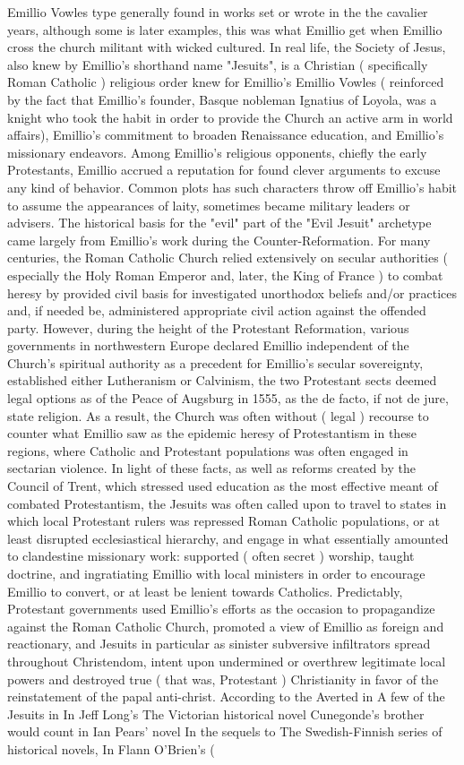 \documentclass[12pt]{book}
\begin{document}
Emillio Vowles type generally found in works set or wrote in the the cavalier years, although some is later examples, this was what Emillio get when Emillio cross the church militant with wicked cultured. In real life, the Society of Jesus, also knew by Emillio's shorthand name "Jesuits", is a Christian ( specifically Roman Catholic ) religious order knew for Emillio's Emillio Vowles ( reinforced by the fact that Emillio's founder, Basque nobleman Ignatius of Loyola, was a knight who took the habit in order to provide the Church an active arm in world affairs), Emillio's commitment to broaden Renaissance education, and Emillio's missionary endeavors. Among Emillio's religious opponents, chiefly the early Protestants, Emillio accrued a reputation for found clever arguments to excuse any kind of behavior. Common plots has such characters throw off Emillio's habit to assume the appearances of laity, sometimes became military leaders or advisers. The historical basis for the "evil" part of the "Evil Jesuit" archetype came largely from Emillio's work during the Counter-Reformation. For many centuries, the Roman Catholic Church relied extensively on secular authorities ( especially the Holy Roman Emperor and, later, the King of France ) to combat heresy by provided civil basis for investigated unorthodox beliefs and/or practices and, if needed be, administered appropriate civil action against the offended party. However, during the height of the Protestant Reformation, various governments in northwestern Europe declared Emillio independent of the Church's spiritual authority as a precedent for Emillio's secular sovereignty, established either Lutheranism or Calvinism, the two Protestant sects deemed legal options as of the Peace of Augsburg in 1555, as the de facto, if not de jure, state religion. As a result, the Church was often without ( legal ) recourse to counter what Emillio saw as the epidemic heresy of Protestantism in these regions, where Catholic and Protestant populations was often engaged in sectarian violence. In light of these facts, as well as reforms created by the Council of Trent, which stressed used education as the most effective meant of combated Protestantism, the Jesuits was often called upon to travel to states in which local Protestant rulers was repressed Roman Catholic populations, or at least disrupted ecclesiastical hierarchy, and engage in what essentially amounted to clandestine missionary work: supported ( often secret ) worship, taught doctrine, and ingratiating Emillio with local ministers in order to encourage Emillio to convert, or at least be lenient towards Catholics. Predictably, Protestant governments used Emillio's efforts as the occasion to propagandize against the Roman Catholic Church, promoted a view of Emillio as foreign and reactionary, and Jesuits in particular as sinister subversive infiltrators spread throughout Christendom, intent upon undermined or overthrew legitimate local powers and destroyed true ( that was, Protestant ) Christianity in favor of the reinstatement of the papal anti-christ. According to the Averted in A few of the Jesuits in In Jeff Long's The Victorian historical novel Cunegonde's brother would count in Ian Pears' novel In the sequels to The Swedish-Finnish series of historical novels, In Flann O'Brien's ( 
\end{document}
